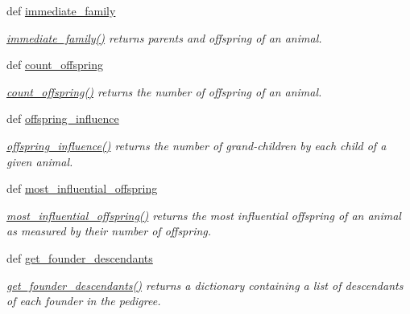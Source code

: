 \begin{CompactItemize}
def \hyperlink{namespacePyPedal_1_1pyp__network_3f216a5694155a42ef0662e0300d71da}{immediate\_\-family}
\begin{CompactList}\small\item\em \hyperlink{namespacePyPedal_1_1pyp__network_3f216a5694155a42ef0662e0300d71da}{immediate\_\-family()} returns parents and offspring of an animal. \item\end{CompactList}\item 
def \hyperlink{namespacePyPedal_1_1pyp__network_3ccbd9df7f8267da05c78783e21a8288}{count\_\-offspring}
\begin{CompactList}\small\item\em \hyperlink{namespacePyPedal_1_1pyp__network_3ccbd9df7f8267da05c78783e21a8288}{count\_\-offspring()} returns the number of offspring of an animal. \item\end{CompactList}\item 
def \hyperlink{namespacePyPedal_1_1pyp__network_ae9a5f01ef47449a3d35fb9fa8c12c39}{offspring\_\-influence}
\begin{CompactList}\small\item\em \hyperlink{namespacePyPedal_1_1pyp__network_ae9a5f01ef47449a3d35fb9fa8c12c39}{offspring\_\-influence()} returns the number of grand-children by each child of a given animal. \item\end{CompactList}\item 
def \hyperlink{namespacePyPedal_1_1pyp__network_4371fc02c48e328c85b9b5d612735bff}{most\_\-influential\_\-offspring}
\begin{CompactList}\small\item\em \hyperlink{namespacePyPedal_1_1pyp__network_4371fc02c48e328c85b9b5d612735bff}{most\_\-influential\_\-offspring()} returns the most influential offspring of an animal as measured by their number of offspring. \item\end{CompactList}\item 
def \hyperlink{namespacePyPedal_1_1pyp__network_6fce4d0fb5654715bf9cb3ff3dd9f38f}{get\_\-founder\_\-descendants}
\begin{CompactList}\small\item\em \hyperlink{namespacePyPedal_1_1pyp__network_6fce4d0fb5654715bf9cb3ff3dd9f38f}{get\_\-founder\_\-descendants()} returns a dictionary containing a list of descendants of each founder in the pedigree. \item\end{CompactList}\item 

\end{CompactItemize}
